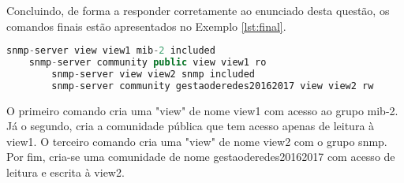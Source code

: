 \documentclass[../momento_1.tex]{subfiles}
\begin{document}
\par Concluindo, de forma a responder corretamente ao enunciado desta questão, os comandos finais estão apresentados no Exemplo \ref{lst:final}.

{
\begin{lstlisting}[caption={Comandos para responder ao enunciado.},label={lst:final},language=JAVA]
	snmp-server view view1 mib-2 included
	snmp-server community public view view1 ro
    	snmp-server view view2 snmp included
    	snmp-server community gestaoderedes20162017 view view2 rw
\end{lstlisting}}

\par O primeiro comando cria uma "view" de nome view1 com acesso ao grupo mib-2. Já o segundo, cria a comunidade pública que tem acesso apenas de leitura à view1. O terceiro comando cria uma "view" de nome view2 com o grupo snmp. Por fim, cria-se uma comunidade de nome gestaoderedes20162017 com acesso de leitura e escrita à view2.
\end{document}
